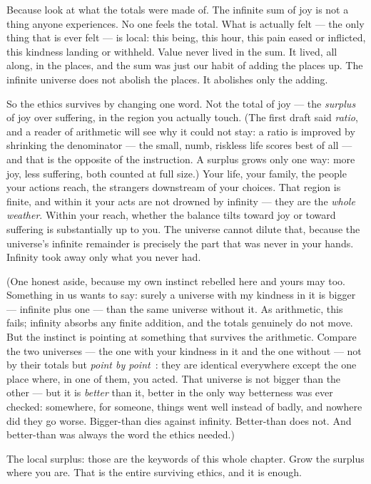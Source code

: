 \documentclass[fontsize=11pt,paper=a4,pagesize=auto,parskip=half-]{scrbook}
\begin{document}
Because look at what the totals were made of. The infinite sum of joy is not a thing anyone experiences. No one feels the total. What is actually felt --- the only thing that is ever felt --- is local: this being, this hour, this pain eased or inflicted, this kindness landing or withheld. Value never lived in the sum. It lived, all along, in the places, and the sum was just our habit of adding the places up. The infinite universe does not abolish the places. It abolishes only the adding.

So the ethics survives by changing one word. Not the total of joy --- the \emph{surplus} of joy over suffering, in the region you actually touch. (The first draft said \emph{ratio}, and a reader of arithmetic will see why it could not stay: a ratio is improved by shrinking the denominator --- the small, numb, riskless life scores best of all --- and that is the opposite of the instruction. A surplus grows only one way: more joy, less suffering, both counted at full size.) Your life, your family, the people your actions reach, the strangers downstream of your choices. That region is finite, and within it your acts are not drowned by infinity --- they are the \emph{whole weather}. Within your reach, whether the balance tilts toward joy or toward suffering is substantially up to you. The universe cannot dilute that, because the universe's infinite remainder is precisely the part that was never in your hands. Infinity took away only what you never had.

(One honest aside, because my own instinct rebelled here and yours may too. Something in us wants to say: surely a universe with my kindness in it is bigger --- infinite plus one --- than the same universe without it. As arithmetic, this fails; infinity absorbs any finite addition, and the totals genuinely do not move. But the instinct is pointing at something that survives the arithmetic. Compare the two universes --- the one with your kindness in it and the one without --- not by their totals but \emph{point by point}~\cite{vallentynekagan1997}: they are identical everywhere except the one place where, in one of them, you acted. That universe is not bigger than the other --- but it is \emph{better} than it, better in the only way betterness was ever checked: somewhere, for someone, things went well instead of badly, and nowhere did they go worse. Bigger-than dies against infinity. Better-than does not. And better-than was always the word the ethics needed.)

The local surplus: those are the keywords of this whole chapter. Grow the surplus where you are. That is the entire surviving ethics, and it is enough.
\end{document}
